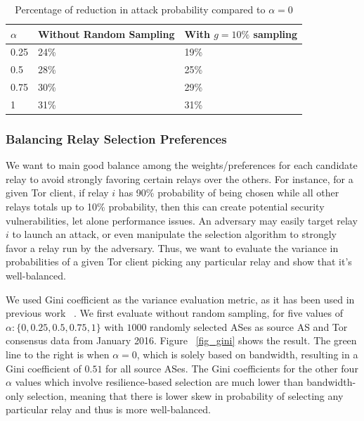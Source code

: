 \begin{table}[ht!]
\begin{center}
 \begin{tabular}{ p{5mm} | p{2.5cm} | p{2.5cm}}
    \hline
    $\alpha$ & Without Random Sampling & With  $g=10\%$ sampling\\ \hline
    0.25 & 24\% & 19\% \\
    0.5 & 28\% & 25\% \\
    0.75 & 30\% & 29\% \\
    1 & 31\% & 31\% \\
    \hline
  \end{tabular}
\end{center}
\caption{Percentage of reduction in attack probability compared to $\alpha=0$ \label{tbl_attack_reduction}}
\end{table}

\subsubsection{Balancing Relay Selection Preferences} 
We want to main good balance among the weights/preferences for each candidate relay to avoid strongly favoring certain relays over the others. For instance, for a given Tor client, if relay $i$ has 90\% probability of being chosen while all other relays totals up to 10\% probability, then this can create potential security vulnerabilities, let alone performance issues. An adversary may easily target relay $i$ to launch an attack, or even manipulate the selection algorithm to strongly favor a relay run by the adversary. Thus, we want to evaluate the variance in probabilities of a given Tor client picking any particular relay and show that it's well-balanced. 

We used Gini coefficient as the variance evaluation metric, as it has been used in previous work ~\cite{akhoondi2012lastor}. We first evaluate without random sampling, for five values of $\alpha: \{0, 0.25, 0.5, 0.75, 1\}$ with $1000$ randomly selected ASes as source AS and Tor consensus data from January 2016. Figure ~\ref{fig_gini} shows the result. The green line to the right is when $\alpha = 0$, which is solely based on bandwidth, resulting in a Gini coefficient of $0.51$ for all source ASes. The Gini coefficients for the other four $\alpha$ values which involve resilience-based selection are much lower than bandwidth-only selection, meaning that there is lower skew in probability of selecting any particular relay and thus is more well-balanced. 

